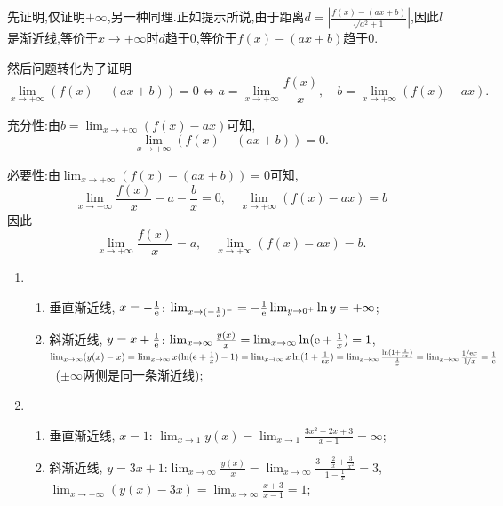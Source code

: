 \begin{solution}
    先证明,仅证明$+\infty$,另一种同理.正如提示所说,由于距离$d=\left| \frac{f(x)-(ax+b)}{\sqrt{a^2+1}} \right|$,因此$l$是渐近线,等价于$x\to+\infty$时$d$趋于$0$,等价于$f(x)-(ax+b)$趋于$0$.

    然后问题转化为了证明$$\lim_{x \to +\infty} (f(x) - (ax+b)) = 0 \Leftrightarrow a = \lim_{x \to +\infty} \frac{f(x)}{x}, \quad b = \lim_{x \to +\infty} (f(x)-ax).$$

    充分性:由$b = \lim_{x \to +\infty} (f(x)-ax)$可知, $$\lim_{x \to +\infty} (f(x) - (ax+b)) = 0.$$

    必要性:由$\lim_{x \to +\infty} (f(x) - (ax+b)) = 0$可知, $$\lim_{x \to +\infty} \frac{f(x)}{x} - a - \frac{b}{x} = 0, \quad \lim_{x \to +\infty} (f(x)-ax) = b$$因此$$\lim_{x \to +\infty} \frac{f(x)}{x} = a, \quad \lim_{x \to +\infty} (f(x)-ax) = b.$$

    \begin{enumerate}[(1)]
        \item
              \begin{enumerate}
                  \item 垂直渐近线, $x=- \frac{1}{\mathrm{e}}$: $\lim_{x \to (-\frac{1}{\mathrm{e}})^-} = -\frac{1}{\mathrm{e}} \lim_{y \to 0^+} \ln y = +\infty$;
                  \item 斜渐近线, $y=x + \frac{1}{\mathrm{e}}$: $\lim_{x \to \infty} \frac{y(x)}{x} = \lim_{x \to \infty} \ln(\mathrm{e} + \frac{1}{x}) = 1$, $\lim_{x \to  \infty} (y(x) - x) = \lim_{x \to \infty} x(\ln(\mathrm{e} + \frac{1}{x}) - 1) = \lim_{x \to \infty} x\ln(1 + \frac{1}{\mathrm{e} x}) = \lim_{x \to \infty} \frac{\ln(1 + \frac{1}{\mathrm{e} x})}{\frac{1}{x}} = \lim_{x \to  \infty} \frac{1 / \mathrm{e} x}{1 / x} = \frac{1}{\mathrm{e}}$ \ ($\pm\infty$两侧是同一条渐近线);
              \end{enumerate}
        \item
              \begin{enumerate}
                  \item 垂直渐近线, $x=1$: $\lim_{x \to 1} y(x) = \lim_{x \to 1} \frac{3x^2 - 2x + 3}{x-1} = \infty$;
                  \item 斜渐近线, $y=3x+1$:$\lim_{x \to \infty} \frac{y(x)}{x} = \lim_{x \to  \infty} \frac{3 - \frac{2}{x} + \frac{3}{x^2}}{1 - \frac{1}{x}} = 3$, $\lim_{x \to + \infty} (y(x) - 3x) = \lim_{x \to \infty} \frac{x+3}{x-1} = 1$;
              \end{enumerate}
    \end{enumerate}
\end{solution}

